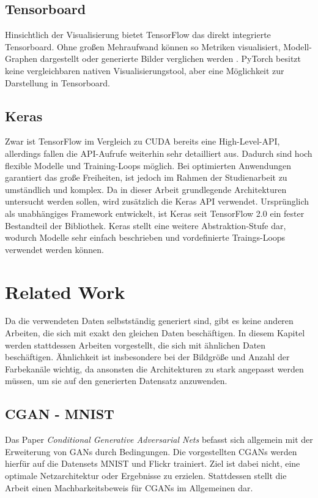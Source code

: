 \subsection{Tensorboard}
Hinsichtlich der Visualisierung bietet TensorFlow das direkt integrierte Tensorboard.
Ohne großen Mehraufwand können so Metriken visualisiert, Modell-Graphen dargestellt oder generierte Bilder verglichen werden \cite{tensorboard}.
PyTorch besitzt keine vergleichbaren nativen Visualisierungstool, aber eine Möglichkeit zur Darstellung in Tensorboard.

\subsection{Keras}
Zwar ist TensorFlow im Vergleich zu CUDA bereits eine High-Level-API, allerdings fallen die API-Aufrufe weiterhin sehr detailliert aus.
Dadurch sind hoch flexible Modelle und Training-Loops möglich.
Bei optimierten Anwendungen garantiert das große Freiheiten, ist jedoch im Rahmen der Studienarbeit zu umständlich und komplex.
Da in dieser Arbeit grundlegende Architekturen untersucht werden sollen, wird zusätzlich die Keras API \cite{keras} verwendet.
Ursprünglich als unabhängiges Framework entwickelt, ist Keras seit TensorFlow 2.0 ein fester Bestandteil der Bibliothek.
Keras stellt eine weitere Abstraktion-Stufe dar, wodurch Modelle sehr einfach beschrieben und vordefinierte Traings-Loops verwendet werden können.

\section{Related Work}
\label{chapter:related-work}
Da die verwendeten Daten selbstständig generiert sind, gibt es keine anderen Arbeiten, die sich mit exakt den gleichen Daten beschäftigen.
In diesem Kapitel werden stattdessen Arbeiten vorgestellt, die sich mit ähnlichen Daten beschäftigen.
Ähnlichkeit ist insbesondere bei der Bildgröße und Anzahl der Farbekanäle wichtig, da ansonsten die Architekturen zu stark angepasst werden müssen, um sie auf den generierten Datensatz anzuwenden.

\subsection{CGAN - MNIST}
Das Paper \textit{Conditional Generative Adversarial Nets} \cite{mirza2014conditional} befasst sich allgemein mit der Erweiterung von GANs durch Bedingungen.
Die vorgestellten CGANs werden hierfür auf die Datensets MNIST und Flickr trainiert.
Ziel ist dabei nicht, eine optimale Netzarchitektur oder Ergebnisse zu erzielen.
Stattdessen stellt die Arbeit einen Machbarkeitsbeweis für CGANs im Allgemeinen dar.
\newline


